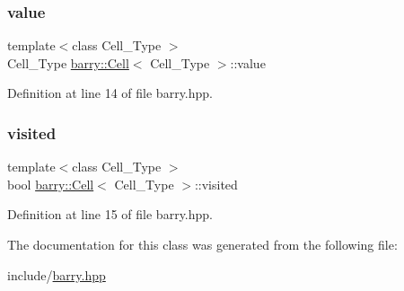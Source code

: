 \subsubsection{\texorpdfstring{value}{value}}
{\footnotesize\ttfamily template$<$class Cell\+\_\+\+Type $>$ \\
Cell\+\_\+\+Type \hyperlink{classbarry_1_1_cell}{barry\+::\+Cell}$<$ Cell\+\_\+\+Type $>$\+::value}



Definition at line 14 of file barry.\+hpp.

\mbox{\label{classbarry_1_1_cell_ad7800879e5079e6b5a3982827adc38c1}} 
\subsubsection{\texorpdfstring{visited}{visited}}
{\footnotesize\ttfamily template$<$class Cell\+\_\+\+Type $>$ \\
bool \hyperlink{classbarry_1_1_cell}{barry\+::\+Cell}$<$ Cell\+\_\+\+Type $>$\+::visited}



Definition at line 15 of file barry.\+hpp.



The documentation for this class was generated from the following file\+:\begin{DoxyCompactItemize}
\item 
include/\hyperlink{barry_8hpp}{barry.\+hpp}\end{DoxyCompactItemize}
